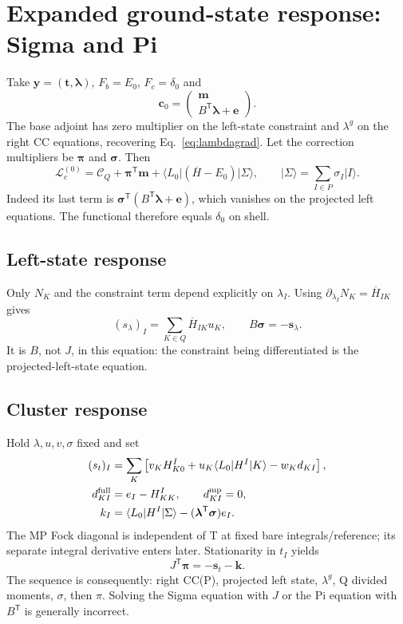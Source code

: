 \documentclass[11pt,letterpaper]{article}
\numberwithin{equation}{section}
\newcommand{\ket}[1]{\lvert #1\rangle}
\newcommand{\bra}[1]{\langle #1\rvert}
\newcommand{\me}[3]{\langle #1\rvert #2\lvert #3\rangle}
\newcommand{\bH}{\overline H}
\newcommand{\T}{\mathsf T}
\begin{document}
\section{Expanded ground-state response: Sigma and Pi}
\label{sec:ground}
Take $\bm y=(\bm t,\bm\lambda)$, $F_b=E_0$, $F_c=\delta_0$ and
\begin{equation}
 \bm c_0=\begin{pmatrix}\bm m\\B^{\T}\bm\lambda+\bm e\end{pmatrix}.
 \label{eq:groundconstraints}
\end{equation}
The base adjoint has zero multiplier on the left-state constraint and
$\lambda^g$ on the right CC equations, recovering Eq.~\eqref{eq:lambdagrad}.
Let the correction multipliers be $\bm\pi$ and $\bm\sigma$. Then
\begin{equation}
 \boxed{\mathcal L_c^{(0)}=\mathcal C_Q+\bm\pi^{\T}\bm m+
       \bra{L_0}(\bH-E_0)\ket{\Sigma},\qquad
       \ket{\Sigma}=\sum_{I\in P}\sigma_I\ket{I}.}
 \label{eq:groundcorrectfunctional}
\end{equation}
Indeed its last term is
$\bm\sigma^{\T}(B^{\T}\bm\lambda+\bm e)$, which vanishes on the projected
left equations. The functional therefore equals $\delta_0$ on shell.

\subsection{Left-state response}
Only $N_K$ and the constraint term depend explicitly on $\lambda_I$.
Using $\partial_{\lambda_I}N_K=\bH_{IK}$ gives
\begin{equation}
 (s_\lambda)_I=\sum_{K\in Q}\bH_{IK}u_K,
 \qquad \boxed{B\bm\sigma=-\bm s_\lambda.}
 \label{eq:sigma}
\end{equation}
It is $B$, not $J$, in this equation: the constraint being differentiated
is the projected-left-state equation.

\subsection{Cluster response}
Hold $\lambda,u,v,\sigma$ fixed and set
\begin{align}
 (s_t)_I&=\sum_K\left[v_KH^I_{K0}
                   +u_K\me{L_0}{H^I}{K}-w_K d_{KI}\right],\\
 d_{KI}^{\rm full}&=e_I-H^I_{KK},\qquad d_{KI}^{\rm mp}=0,\\
 k_I&=\me{L_0}{H^I}{\Sigma}
                      -(\bm\lambda^{\T}\bm\sigma)e_I.
 \label{eq:groundsource}
\end{align}
The MP Fock diagonal is independent of T at fixed bare integrals/reference;
its separate integral derivative enters later. Stationarity in $t_I$ yields
\begin{equation}
 \boxed{J^{\T}\bm\pi=-\bm s_t-\bm k.}
 \label{eq:pi}
\end{equation}
The sequence is consequently: right CC(P), projected left state,
$\lambda^g$, Q divided moments, $\sigma$, then $\pi$. Solving the Sigma
equation with $J$ or the Pi equation with $B^{\T}$ is generally incorrect.
\end{document}
